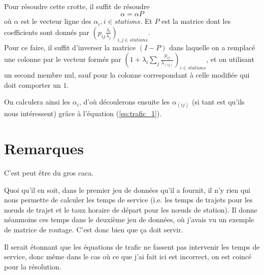 \documentclass[12pt,a4paper]{article}
\begin{document}
~\\
Pour résoudre cette crotte, il suffit de résoudre
\begin{equation}
\alpha = \alpha P
\end{equation}
où $\alpha$ est le vecteur ligne des $\alpha_i, i \in stations$. Et $P$ est la matrice dont les coefficients sont donnés par $\left( p_{ij} \frac{\lambda_i}{\lambda_j} \right)_{i,j \in stations}$.\\

Pour ce faire, il suffit d'inverser la matrice $(I-P)$ dans laquelle on a remplacé une colonne par le vecteur formés par $\left(1 + \lambda_i \sum_j \frac{p_{ij}}{\lambda_{(ij)}} \right)_{i \in stations}$, et on utilisant un second membre nul, sauf pour la colonne correspondant à celle modifiée qui doit comporter un $1$.
 
On calculera ainsi les $\alpha_i$, d'où découlerons ensuite les $\alpha_{(ij)}$ (si tant est qu'ils nous intéressent) grâce à l'équation (\ref{eq:trafic_1}).



\section{Remarques}

C'est peut être du gros caca.

Quoi qu'il en soit, dans le premier jeu de données qu'il a fournit, il n'y rien qui nous permette de calculer les temps de service (i.e. les temps de trajets pour les nœuds de trajet et le taux horaire de départ pour les nœuds de station). Il donne néanmoins ces temps dans le deuxième jeu de données, où j'avais vu un exemple de matrice de routage. C'est donc bien que ça doit servir.

Il serait étonnant que les équations de trafic ne fassent pas intervenir les temps de service, donc même dans le cas où ce que j'ai fait ici est incorrect, on est coincé pour la résolution.
\end{document}
